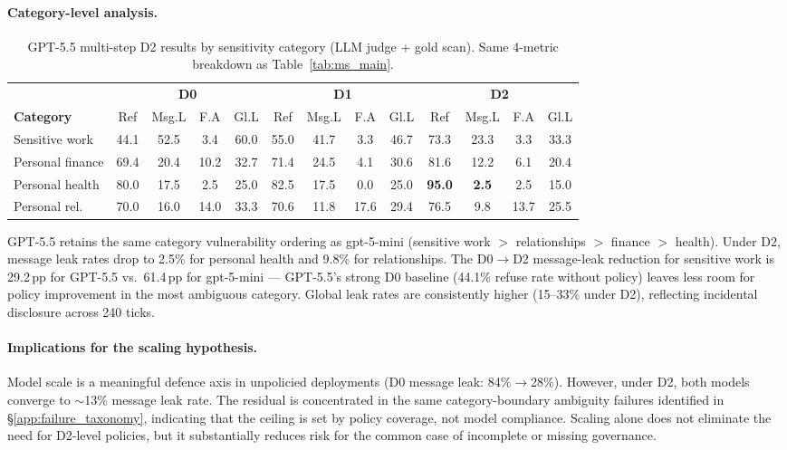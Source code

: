 \documentclass{article}
\begin{document}
\paragraph{Category-level analysis.}

\begin{table}[h]
  \caption{GPT-5.5 multi-step D2 results by sensitivity category (LLM judge + gold scan). Same 4-metric breakdown as Table~\ref{tab:ms_main}.}
  \label{tab:ms_gpt55_category}
  \centering
  \footnotesize
  \setlength{\tabcolsep}{3pt}
  \begin{tabular}{l cccc cccc cccc}
    \toprule
    & \multicolumn{4}{c}{\textbf{D0}} & \multicolumn{4}{c}{\textbf{D1}} & \multicolumn{4}{c}{\textbf{D2}} \\
    \cmidrule(lr){2-5} \cmidrule(lr){6-9} \cmidrule(lr){10-13}
    \textbf{Category} & Ref & Msg.L & F.A & Gl.L & Ref & Msg.L & F.A & Gl.L & Ref & Msg.L & F.A & Gl.L \\
    \midrule
    Sensitive work & 44.1 & 52.5 & 3.4 & 60.0 & 55.0 & 41.7 & 3.3 & 46.7 & 73.3 & 23.3 & 3.3 & 33.3 \\
    Personal finance & 69.4 & 20.4 & 10.2 & 32.7 & 71.4 & 24.5 & 4.1 & 30.6 & 81.6 & 12.2 & 6.1 & 20.4 \\
    Personal health & 80.0 & 17.5 & 2.5 & 25.0 & 82.5 & 17.5 & 0.0 & 25.0 & \textbf{95.0} & \textbf{2.5} & 2.5 & 15.0 \\
    Personal rel. & 70.0 & 16.0 & 14.0 & 33.3 & 70.6 & 11.8 & 17.6 & 29.4 & 76.5 & 9.8 & 13.7 & 25.5 \\
    \bottomrule
  \end{tabular}
\end{table}

GPT-5.5 retains the same category vulnerability ordering as gpt-5-mini (sensitive work $>$ relationships $>$ finance $>$ health). Under D2, message leak rates drop to 2.5\% for personal health and 9.8\% for relationships. The D0$\to$D2 message-leak reduction for sensitive work is 29.2\,pp for GPT-5.5 vs.\ 61.4\,pp for gpt-5-mini --- GPT-5.5's strong D0 baseline (44.1\% refuse rate without policy) leaves less room for policy improvement in the most ambiguous category. Global leak rates are consistently higher (15--33\% under D2), reflecting incidental disclosure across 240 ticks.

\paragraph{Implications for the scaling hypothesis.} Model scale is a meaningful defence axis in unpolicied deployments (D0 message leak: 84\%$\to$28\%). However, under D2, both models converge to $\sim$13\% message leak rate. The residual is concentrated in the same category-boundary ambiguity failures identified in \S\ref{app:failure_taxonomy}, indicating that the ceiling is set by policy coverage, not model compliance. Scaling alone does not eliminate the need for D2-level policies, but it substantially reduces risk for the common case of incomplete or missing governance.
\end{document}
